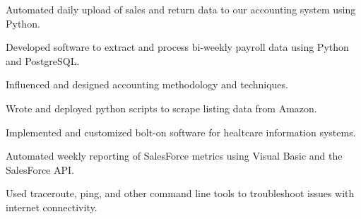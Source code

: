 \documentclass[]{deemweaver}
\begin{document}
\begin{minipage}[t]{0.66\textwidth}
\begin{tightemize}
\vspace{\topsep} %
\item Automated daily upload of sales and return data to our accounting system using Python.
\item Developed software to extract and process bi-weekly payroll data using Python and PostgreSQL.
\item Influenced and designed accounting methodology and techniques.
\end{tightemize}
\sectionsep

\begin{tightemize}
\item Wrote and deployed python scripts to scrape listing data from Amazon.
\end{tightemize}
\sectionsep


\begin{tightemize}
\item Implemented and customized bolt-on software for healtcare information systems.
\end{tightemize}
\sectionsep

\begin{tightemize}
\item Automated weekly reporting of SalesForce metrics using Visual Basic and the SalesForce API.
\end{tightemize}
\sectionsep

\begin{tightemize}
\item Used traceroute, ping, and other command line tools to troubleshoot issues with internet connectivity.
\end{tightemize}
\sectionsep



\end{minipage}
\end{document}
